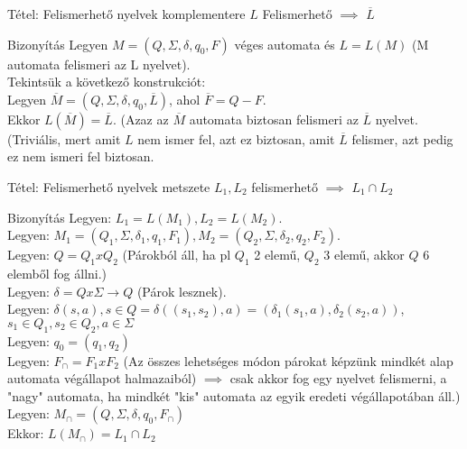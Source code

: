 \documentclass{beamer}
\begin{document}
\begin{frame}
\begin{block}{Tétel: Felismerhető nyelvek komplementere}
$L$ Felismerhető $\implies$ $\overline{L}$

\end{block}

\begin{block}{Bizonyítás}
Legyen $M = (Q, \Sigma , \delta , q_0, F)$ véges automata és $L = L(M)$ (M automata felismeri az L nyelvet).\\
Tekintsük a következő konstrukciót:\\
Legyen $\overline{M} = (Q, \Sigma , \delta, q_0, \overline{L})$, ahol $\overline{F} = Q - F$.\\
Ekkor  $L(\overline{M}) = \overline{L}$. (Azaz az $\overline{M}$ automata biztosan felismeri az $\overline{L}$ nyelvet.\\ 
(Triviális, mert amit $L$ nem ismer fel, azt ez biztosan, amit $\overline{L}$ felismer, azt pedig ez nem ismeri fel biztosan.

\end{block}

\end{frame}

\begin{frame}
\begin{block}{Tétel: Felismerhető nyelvek metszete}
$L_1, L_2$ felismerhető $\implies$ $L_1 \cap L_2$

\end{block}

\begin{block}{Bizonyítás}
Legyen: $L_1 = L(M_1), L_2 = L(M_2)$.\\
Legyen: $M_1 = (Q_1, \Sigma , {\delta}_1, q_1, F_1), M_2 = (Q_2, \Sigma , {\delta}_2, q_2, F_2)$.\\
Legyen: $Q = Q_1 x Q_2$ (Párokból áll, ha pl $Q_1$ 2 elemű, $Q_2$ 3 elemű, akkor $Q$ 6 elemből fog állni.)\\
Legyen: $\delta = Q x \Sigma \rightarrow Q$ (Párok lesznek).\\
Legyen: $\delta(s, a), s \in Q = \delta((s_1, s_2), a) = ({\delta}_1(s_1, a), {\delta}_2(s_2, a))$, $s_1 \in Q_1, s_2 \in Q_2, a \in \Sigma$\\
\bigskip
Legyen: $q_0 = (q_1, q_2)$\\
Legyen: \underline{\textbf{$F_{\cap} = F_1 x F_2$}} (Az összes lehetséges módon párokat képzünk mindkét alap automata végállapot halmazaiból) $\implies$ csak akkor fog egy nyelvet felismerni, a "nagy" automata, ha mindkét "kis" automata az egyik eredeti végállapotában áll.)\\
\smallskip
Legyen: $M_{\cap} = (Q, \Sigma , \delta , q_0, F_{\cap})$\\
\bigskip
Ekkor: \underline{$L(M_{\cap}) = L_1 \cap L_2$}\\
\end{block}

\end{frame}
\end{document}
